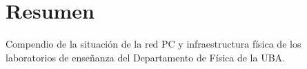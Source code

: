 \thispagestyle{plain}
\chapter[Resumen]{Resumen}
Compendio de la situación de la red PC y infraestructura física de los laboratorios de enseñanza del Departamento de Física de la UBA.
\label{cp:Resumen}